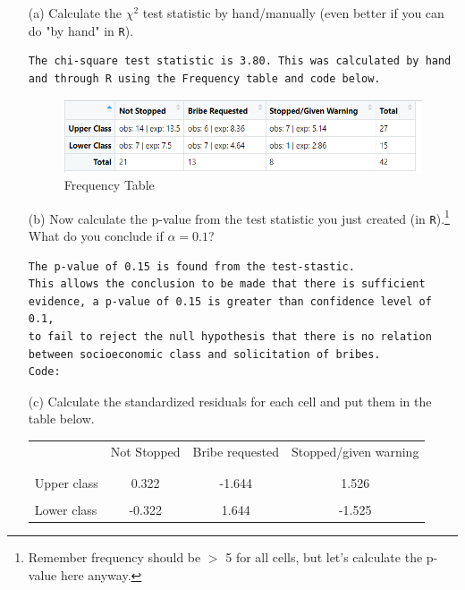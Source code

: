 \documentclass[12pt,letterpaper]{article}
\begin{document}
\begin{enumerate}
	\item [(a)]
	Calculate the $\chi^2$ test statistic by hand/manually (even better if you can do "by hand" in \texttt{R}).
\begin{Verbatim}
The chi-square test statistic is 3.80. This was calculated by hand 
and through R using the Frequency table and code below.
\end{Verbatim}
\begin{figure}[h!]\centering
	\caption{\footnotesize Frequency Table}
	\label{fig:Table 1}
	\includegraphics[width=.85\textwidth]{frequencies.png}
\end{figure}
  
	
	\item [(b)]
	Now calculate the p-value from the test statistic you just created (in \texttt{R}).\footnote{Remember frequency should be $>$ 5 for all cells, but let's calculate the p-value here anyway.}  What do you conclude if $\alpha = 0.1$?\\
\begin{Verbatim}
The p-value of 0.15 is found from the test-stastic. 
This allows the conclusion to be made that there is sufficient 
evidence, a p-value of 0.15 is greater than confidence level of 0.1, 
to fail to reject the null hypothesis that there is no relation 
between socioeconomic class and solicitation of bribes. 
Code:
\end{Verbatim}
  
	\item [(c)] Calculate the standardized residuals for each cell and put them in the table below.
	\vspace{1cm}
	
	\begin{table}[h]
		\centering
		\begin{tabular}{l | c c c }
			& Not Stopped & Bribe requested & Stopped/given warning \\
			\\[-1.8ex] 
			\hline \\[-1.8ex]
			Upper class  & 0.322 & -1.644  & 1.526  \\
			\\
			Lower class & -0.322 & 1.644  & -1.525  \\
		\end{tabular}
	\end{table}
  


\end{enumerate}
\end{document}
